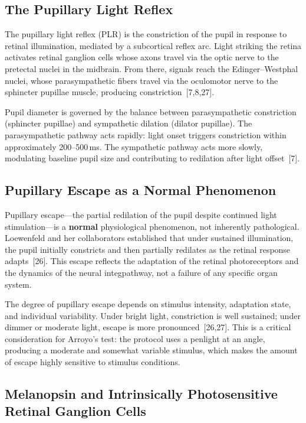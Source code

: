 \documentclass[11pt]{article}
\begin{document}
\subsection{The Pupillary Light Reflex}

The pupillary light reflex (PLR) is the constriction of the pupil in response
to retinal illumination, mediated by a subcortical reflex arc. Light striking
the retina activates retinal ganglion cells whose axons travel via the optic
nerve to the pretectal nuclei in the midbrain. From there, signals reach the
Edinger--Westphal nuclei, whose parasympathetic fibers travel via the
oculomotor nerve to the sphincter pupillae muscle, producing
constriction~[7,8,27].

Pupil diameter is governed by the balance between parasympathetic
constriction (sphincter pupillae) and sympathetic dilation (dilator
pupillae). The parasympathetic pathway acts rapidly: light onset triggers
constriction within approximately 200--500\,ms. The sympathetic pathway acts
more slowly, modulating baseline pupil size and contributing to redilation
after light offset~[7].

\subsection{Pupillary Escape as a Normal Phenomenon}

Pupillary escape---the partial redilation of the pupil despite continued light
stimulation---is a \textbf{normal} physiological phenomenon, not inherently
pathological. Loewenfeld and her collaborators established that under
sustained illumination, the pupil initially constricts and then partially
redilates as the retinal response adapts~[26]. This escape reflects the
adaptation of the retinal photoreceptors and the dynamics of the neural
integpathway, not a failure of any specific organ system.

The degree of pupillary escape depends on stimulus intensity, adaptation
state, and individual variability. Under bright light, constriction is
well sustained; under dimmer or moderate light, escape is more
pronounced~[26,27]. This is a critical consideration for Arroyo's test:
the protocol uses a penlight at an angle, producing a moderate and somewhat
variable stimulus, which makes the amount of escape highly sensitive to
stimulus conditions.

\subsection{Melanopsin and Intrinsically Photosensitive Retinal Ganglion Cells}
\end{document}
